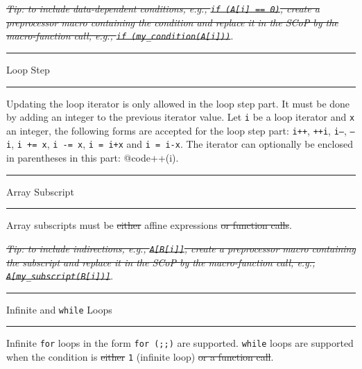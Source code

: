 \documentclass[landscape,a4paper]{article}
\def\titre#1{\begin{center}\hrule\vspace{0.1cm}#1
\vspace{0.07cm}\hrule\end{center}}
\begin{document}
\begin{multicols}{3}
\begin{small}
\vspace{0.3cm}
\textit{\sout{Tip: to include data-dependent conditions, e.g.,
{\tt if (A[i] == 0)}, create a preprocessor macro containing
the condition and replace it in the SCoP by the macro-function call,
e.g., {\tt if (my\_condition(A[i]))}}}.
\end{small}

\titre{Loop Step}

\begin{small}
Updating the loop iterator is only allowed in the loop step part.
It must be done by adding an integer to the previous
iterator value. Let {\tt i} be a loop iterator and {\tt x} an integer,
the following forms are accepted for the loop step part:
{\tt i++}, {\tt ++i}, {\tt i---}, {\tt ---i}, {\tt i += x}, {\tt i -= x}, {\tt i = i+x} and
{\tt i = i-x}. The iterator can optionally be enclosed
in parentheses in this part: @code{++(i)}.
\end{small}

\titre{Array Subscript}

\begin{small}
Array subscripts must be \sout{either} affine expressions \sout{or function calls}.

\vspace{0.3cm}
\textit{\sout{Tip: to include indirections, e.g., {\tt A[B[i]]}, create a
preprocessor macro containing the subscript and replace it in the SCoP by
the macro-function call, e.g., {\tt A[my\_subscript(B[i])]}}}.
\end{small}

\titre{Infinite and {\tt while} Loops}

\begin{small}
Infinite {\tt for} loops in the form {\tt for (;;)} are supported.
{\tt while} loops are supported when the condition is \sout{either} {\tt 1}
(infinite loop) \sout{or a function call}.
\end{small}

\end{multicols}
\end{document}
